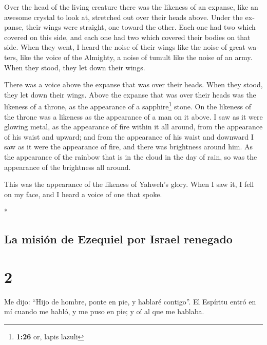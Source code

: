 \begin{paracol}{2}
\begin{otherlanguage}{english}
 Over the head of the living creature there was the
likeness of an expanse, like an awesome crystal to look at, stretched
out over their heads above.  Under the expanse, their
wings were straight, one toward the other. Each one had two which
covered on this side, and each one had two which covered their bodies on
that side.  When they went, I heard the noise of their
wings like the noise of great waters, like the voice of the Almighty, a
noise of tumult like the noise of an army. When they stood, they let
down their wings.

 There was a voice above the expanse that was over their
heads. When they stood, they let down their wings.  Above
the expanse that was over their heads was the likeness of a throne, as
the appearance of a sapphire\footnote{\textbf{1:26} or, lapis lazuli}
stone. On the likeness of the throne was a likeness as the appearance of
a man on it above.  I saw as it were glowing metal, as
the appearance of fire within it all around, from the appearance of his
waist and upward; and from the appearance of his waist and downward I
saw as it were the appearance of fire, and there was brightness around
him.  As the appearance of the rainbow that is in the
cloud in the day of rain, so was the appearance of the brightness all
around.

This was the appearance of the likeness of Yahweh's glory. When I saw
it, I fell on my face, and I heard a voice of one that spoke.

\end{otherlanguage}

\switchcolumn[0]*

\hypertarget{la-misiuxf3n-de-ezequiel-por-israel-renegado}{%
\subsection{La misión de Ezequiel por Israel
renegado}\label{la-misiuxf3n-de-ezequiel-por-israel-renegado}}

\hypertarget{section-2}{%
\section{2}\label{section-2}}

 Me dijo: ``Hijo de hombre, ponte en pie, y hablaré
contigo''.  El Espíritu entró en mí cuando me habló, y me
puso en pie; y oí al que me hablaba.


\end{paracol}
